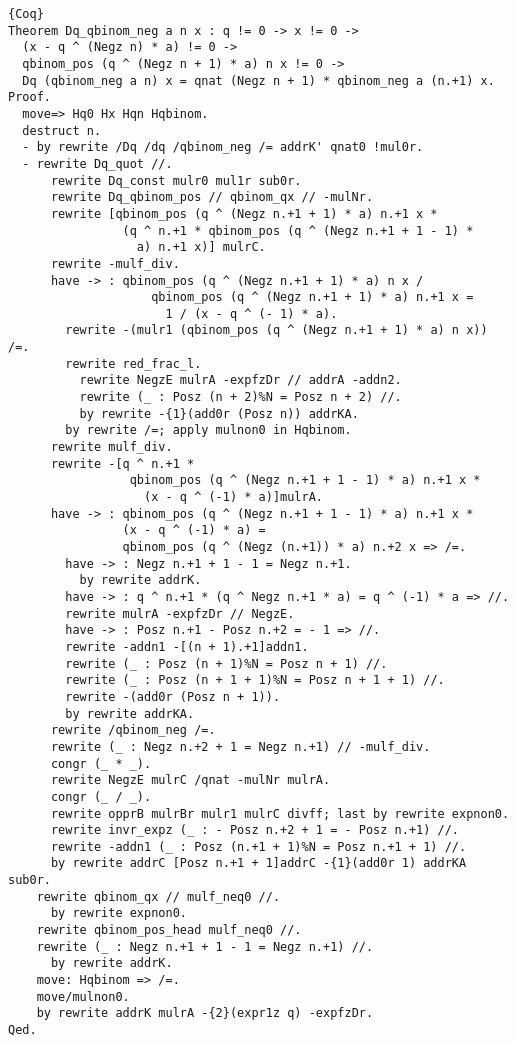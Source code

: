 \documentclass[11pt]{jsreport}
\theoremstyle{mystyle}
\newcommand{\0}{\textbf{0}}
\newcommand{\1}{\textbf{1}}
\newcommand{\2}{\textbf{2}}
\begin{document}
\begin{lstlisting}{Coq}
Theorem Dq_qbinom_neg a n x : q != 0 -> x != 0 ->
  (x - q ^ (Negz n) * a) != 0 ->
  qbinom_pos (q ^ (Negz n + 1) * a) n x != 0 ->
  Dq (qbinom_neg a n) x = qnat (Negz n + 1) * qbinom_neg a (n.+1) x.
Proof.
  move=> Hq0 Hx Hqn Hqbinom.
  destruct n.
  - by rewrite /Dq /dq /qbinom_neg /= addrK' qnat0 !mul0r.
  - rewrite Dq_quot //.
      rewrite Dq_const mulr0 mul1r sub0r.
      rewrite Dq_qbinom_pos // qbinom_qx // -mulNr.
      rewrite [qbinom_pos (q ^ (Negz n.+1 + 1) * a) n.+1 x *
                (q ^ n.+1 * qbinom_pos (q ^ (Negz n.+1 + 1 - 1) *
                  a) n.+1 x)] mulrC.
      rewrite -mulf_div.
      have -> : qbinom_pos (q ^ (Negz n.+1 + 1) * a) n x /
                    qbinom_pos (q ^ (Negz n.+1 + 1) * a) n.+1 x =
                      1 / (x - q ^ (- 1) * a).
        rewrite -(mulr1 (qbinom_pos (q ^ (Negz n.+1 + 1) * a) n x)) /=.
        rewrite red_frac_l.
          rewrite NegzE mulrA -expfzDr // addrA -addn2.
          rewrite (_ : Posz (n + 2)%N = Posz n + 2) //.
          by rewrite -{1}(add0r (Posz n)) addrKA.
        by rewrite /=; apply mulnon0 in Hqbinom.
      rewrite mulf_div.
      rewrite -[q ^ n.+1 *
                 qbinom_pos (q ^ (Negz n.+1 + 1 - 1) * a) n.+1 x *
                   (x - q ^ (-1) * a)]mulrA.
      have -> : qbinom_pos (q ^ (Negz n.+1 + 1 - 1) * a) n.+1 x *
                (x - q ^ (-1) * a) =
                qbinom_pos (q ^ (Negz (n.+1)) * a) n.+2 x => /=.
        have -> : Negz n.+1 + 1 - 1 = Negz n.+1.
          by rewrite addrK.
        have -> : q ^ n.+1 * (q ^ Negz n.+1 * a) = q ^ (-1) * a => //.
        rewrite mulrA -expfzDr // NegzE.
        have -> : Posz n.+1 - Posz n.+2 = - 1 => //.
        rewrite -addn1 -[(n + 1).+1]addn1.
        rewrite (_ : Posz (n + 1)%N = Posz n + 1) //.
        rewrite (_ : Posz (n + 1 + 1)%N = Posz n + 1 + 1) //.
        rewrite -(add0r (Posz n + 1)).
        by rewrite addrKA.
      rewrite /qbinom_neg /=.
      rewrite (_ : Negz n.+2 + 1 = Negz n.+1) // -mulf_div.
      congr (_ * _).
      rewrite NegzE mulrC /qnat -mulNr mulrA.
      congr (_ / _).
      rewrite opprB mulrBr mulr1 mulrC divff; last by rewrite expnon0.
      rewrite invr_expz (_ : - Posz n.+2 + 1 = - Posz n.+1) //.
      rewrite -addn1 (_ : Posz (n.+1 + 1)%N = Posz n.+1 + 1) //.
      by rewrite addrC [Posz n.+1 + 1]addrC -{1}(add0r 1) addrKA sub0r.
    rewrite qbinom_qx // mulf_neq0 //.
      by rewrite expnon0.
    rewrite qbinom_pos_head mulf_neq0 //.
    rewrite (_ : Negz n.+1 + 1 - 1 = Negz n.+1) //.
      by rewrite addrK.
    move: Hqbinom => /=.
    move/mulnon0.
    by rewrite addrK mulrA -{2}(expr1z q) -expfzDr.
Qed.\end{lstlisting}
\end{document}
